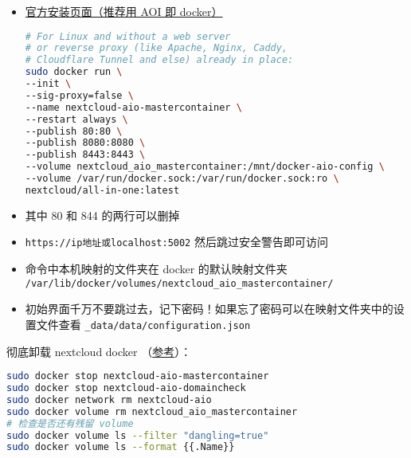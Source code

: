 
\begin{itemize}
\item \href{https://nextcloud.com/install/}{官方安装页面（推荐用 AOI 即 docker）}
\begin{lstlisting}[language=bash]
# For Linux and without a web server
# or reverse proxy (like Apache, Nginx, Caddy,
# Cloudflare Tunnel and else) already in place:
sudo docker run \
--init \
--sig-proxy=false \
--name nextcloud-aio-mastercontainer \
--restart always \
--publish 80:80 \
--publish 8080:8080 \
--publish 8443:8443 \
--volume nextcloud_aio_mastercontainer:/mnt/docker-aio-config \
--volume /var/run/docker.sock:/var/run/docker.sock:ro \
nextcloud/all-in-one:latest
\end{lstlisting}
\item 其中 80 和 844 的两行可以删掉
\item \verb`https://ip地址或localhost:5002` 然后跳过安全警告即可访问
\item 命令中本机映射的文件夹在 docker 的默认映射文件夹 \verb`/var/lib/docker/volumes/nextcloud_aio_mastercontainer/`
\item 初始界面千万不要跳过去，记下密码！如果忘了密码可以在映射文件夹中的设置文件查看 \verb`_data/data/configuration.json`
\end{itemize}

彻底卸载 nextcloud docker （\href{https://github.com/nextcloud/all-in-one#how-to-properly-reset-the-instance}{参考}）：
\begin{lstlisting}[language=bash]
sudo docker stop nextcloud-aio-mastercontainer
sudo docker stop nextcloud-aio-domaincheck
sudo docker network rm nextcloud-aio
sudo docker volume rm nextcloud_aio_mastercontainer
# 检查是否还有残留 volume
sudo docker volume ls --filter "dangling=true"
sudo docker volume ls --format {{.Name}}
\end{lstlisting}
